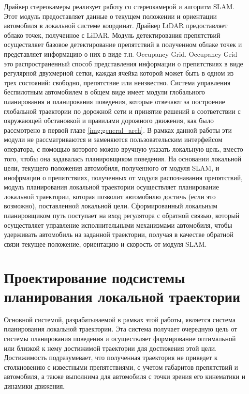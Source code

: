 Драйвер стереокамеры реализует работу со стереокамерой и алгоритм SLAM. Этот модуль предоставляет данные о текущем
положении и ориентации автомобиля в локальной системе координат. Драйвер LiDAR предоставляет облако точек, полученное
с LiDAR. Модуль детектирования препятствий осуществляет базовое детектирование препятствий в полученном облаке точек
и представляет информацию о них в виде т.н. Occupancy Grid. Occupancy Grid - это распространенный способ представления
информации о препятствиях в виде регулярной двухмерной сетки, каждая ячейка которой может быть в одном из трех
состояний: свободно, препятствие или неизвестно. Система управления беспилотным автомобилем в общем виде имеет модули
глобального планирования и планирования поведения, которые отвечают за построение глобальной траектории по дорожной
сети и принятие решений в соответствии с окружающей обстановкой и правилами дорожного движения, как было рассмотрено
в первой главе \ref{img:general_arch}. В рамках данной работы эти модули не рассматриваются и заменяются пользовательским
интерфейсом оператора, с помощью которого можно вручную указать локальную цель, вместо того, чтобы она задавалась
планировщиком поведения. На основании локальной цели, текущего положения автомобиля, полученного от модуля SLAM, и
инофрмации о препятствиях, полученных от модуля распознавания препятствий, модуль планирования локальной траектории
осуществляет планирование локальной траектории, которая позволит автомобилю достичь (если это возможно), поставленной
локальной цели. Сформированный локальным планировщиком путь поступает на вход регулятора с обратной связью, который
осуществляет управление исполнительными механизмами автомобиля, чтобы удерживать автомобиль на заданной траектории,
получая в качестве обратной связи текущее положение, ориентацию и скорость от модуля SLAM.

\section{Проектирование подсистемы планирования локальной траектории}
Основной системой, разрабатываемой в рамках этой работы, является система планирования локальной траектории. Эта система
получает очередную цель от системы планирования поведения и осуществляет формирование оптимальной или близкой к нему
достижимой траектории для достижения этой цели. Достижимость подразумевает, что полученная траектория не приведет к
столкновению с известными препятствиями, с учетом габаритов препятствий и автомобиля, а также выполнима для автомобиля
с точки зрения его кинематики и динамики движения.

